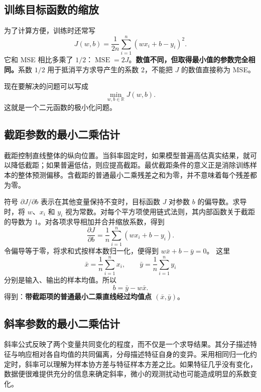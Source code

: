 \subsection{训练目标函数的缩放}

为了计算方便，训练时还常写
\begin{equation}\label{eq:linear-objective}
J(w,b)=\frac1{2n}\sum_{i=1}^{n}(wx_i+b-y_i)^2.
\end{equation}
它和 MSE 相比多乘了 $1/2$：$\operatorname{MSE}=2J$。\textbf{数值不同，但取得最小值的参数完全相同。}系数 $1/2$ 用于抵消平方求导产生的系数 $2$，不能把 $J$ 的数值直接称为 MSE。

现在要解决的问题可以写成
\[
\min_{w,b\in\mathbb R}J(w,b).
\]
这就是一个二元函数的极小化问题。

\subsection{截距参数的最小二乘估计}

截距控制直线整体的纵向位置。当斜率固定时，如果模型普遍高估真实结果，就可以降低截距；如果普遍低估，则应提高截距。最优截距条件的意义正是消除训练样本的整体预测偏移。含截距的普通最小二乘残差之和为零，并不意味着每个残差都为零。

符号 $\partial J/\partial b$ 表示在其他变量保持不变时，目标函数 $J$ 对参数 $b$ 的偏导数。求导时，将 $w$、$x_i$ 和 $y_i$ 视为常数。对每个平方项使用链式法则，其内部函数关于截距的导数为 $1$。对各项求导相加并合并缩放系数，得到
\begin{equation}\label{eq:partial-b}
\frac{\partial J}{\partial b}
=\frac1n\sum_{i=1}^{n}(wx_i+b-y_i).
\end{equation}
令偏导等于零，将求和式按样本数归一化，便得到 $w\bar x+b-\bar y=0$。
这里
\[
\bar x=\frac1n\sum_{i=1}^{n}x_i,\qquad
\bar y=\frac1n\sum_{i=1}^{n}y_i
\]
分别是输入、输出的样本均值。所以
\begin{equation}\label{eq:intercept-ls}
b=\bar y-w\bar x.
\end{equation}
得到：\textbf{带截距项的普通最小二乘直线经过均值点 $(\bar x,\bar y)$}。

\subsection{斜率参数的最小二乘估计}

斜率公式反映了两个变量共同变化的程度，而不仅是一个求导结果。其分子描述特征与响应相对各自均值的共同偏离，分母描述特征自身的变异。采用相同归一化约定时，斜率可以理解为样本协方差与特征样本方差之比。如果特征几乎没有变化，数据便很难提供充分的信息来确定斜率，微小的观测扰动也可能造成明显的系数变化。

